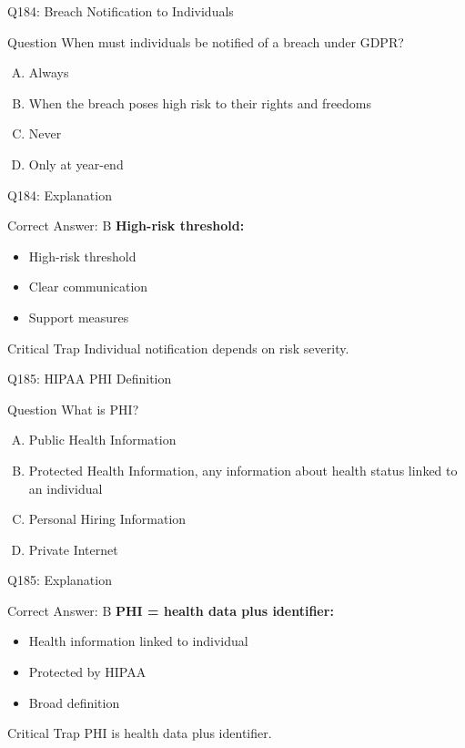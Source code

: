 \documentclass{beamer}
\begin{document}
	\begin{frame}{Q184: Breach Notification to Individuals}
		\begin{block}{Question}
			When must individuals be notified of a breach under GDPR?
		\end{block}
		\begin{enumerate}[(A)]
			\item Always
			\item When the breach poses high risk to their rights and freedoms
			\item Never
			\item Only at year-end
		\end{enumerate}
	\end{frame}
	
	\begin{frame}{Q184: Explanation}
		\begin{block}{Correct Answer: B}
			\textbf{High-risk threshold:}
			\begin{itemize}
				\item High-risk threshold
				\item Clear communication
				\item Support measures
			\end{itemize}
		\end{block}
		\begin{alertblock}{Critical Trap}
			Individual notification depends on risk severity.
		\end{alertblock}
	\end{frame}
	
	\begin{frame}{Q185: HIPAA PHI Definition}
		\begin{block}{Question}
			What is PHI?
		\end{block}
		\begin{enumerate}[(A)]
			\item Public Health Information
			\item Protected Health Information, any information about health status linked to an individual
			\item Personal Hiring Information
			\item Private Internet
		\end{enumerate}
	\end{frame}
	
	\begin{frame}{Q185: Explanation}
		\begin{block}{Correct Answer: B}
			\textbf{PHI = health data plus identifier:}
			\begin{itemize}
				\item Health information linked to individual
				\item Protected by HIPAA
				\item Broad definition
			\end{itemize}
		\end{block}
		\begin{alertblock}{Critical Trap}
			PHI is health data plus identifier.
		\end{alertblock}
	\end{frame}
	
\end{document}
